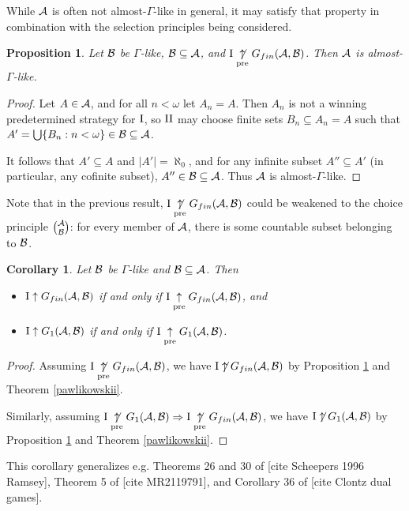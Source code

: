 \documentclass{amsart}
\theoremstyle{plain}
\newtheorem{corollary}[theorem]{Corollary}
\newtheorem{proposition}[theorem]{Proposition}
\theoremstyle{definition}
\theoremstyle{remark}
\theoremstyle{plain}
\theoremstyle{definition}
\theoremstyle{remark}
\begin{document}
While \(\mathcal{A}\) is often not almost-\(\Gamma\)-like in general,
it may satisfy that property in combination with the selection principles
being considered.

\begin{proposition}\label{auto-asl}
Let \(\mathcal{B}\) be \(\Gamma\)-like, \(\mathcal{B}\subseteq\mathcal{A}\),
and \(\mathrm{I}\underset{\text{pre}}{\not\uparrow} G_{fin}(\mathcal{A},\mathcal{B})\). Then
\(\mathcal{A}\) is almost-\(\Gamma\)-like.
\end{proposition}
\begin{proof}
Let \(A\in\mathcal{A}\), and for all \(n<\omega\) let \(A_n=A\).
Then \(A_n\) is not a winning predetermined strategy for
\(\mathrm{I}\), so \(\mathrm{II}\) may choose finite sets
\(B_n\subseteq A_n=A\) such that 
\(A'=\bigcup\{B_n:n<\omega\}\in\mathcal{B}\subseteq\mathcal{A}\).

It follows that \(A'\subseteq A\) and \(|A'|=\aleph_0\), 
and for any infinite subset
\(A''\subseteq A'\) (in particular, any cofinite subset),
\(A''\in\mathcal{B}\subseteq\mathcal{A}\). Thus \(\mathcal{A}\) is almost-\(\Gamma\)-like.
\end{proof}

Note that in the previous result, 
\(\mathrm{I}\underset{\text{pre}}{\not\uparrow} G_{fin}(\mathcal{A},\mathcal{B})\) could be weakened
to the choice principle \({\mathcal{A}}\choose{\mathcal{B}}\): for every
member of \(\mathcal{A}\), there is some countable subset belonging to \(\mathcal{B}\).


\begin{corollary}
Let \(\mathcal{B}\) be \(\Gamma\)-like and \(\mathcal{B}\subseteq\mathcal{A}\).
Then 
\begin{itemize}
\item \(\mathrm{I}\uparrow G_{fin}(\mathcal{A},\mathcal{B})\) if and only if
\(\mathrm{I}\underset{\text{pre}}{\uparrow} G_{fin}(\mathcal{A},\mathcal{B})\), and
\item \(\mathrm{I}\uparrow G_{1}(\mathcal{A},\mathcal{B})\) if and only if
\(\mathrm{I}\underset{\text{pre}}{\uparrow} G_{1}(\mathcal{A},\mathcal{B})\).
\end{itemize}
\end{corollary}
\begin{proof}
Assuming \(\mathrm{I}\underset{\text{pre}}{\not\uparrow} G_{fin}(\mathcal{A},\mathcal{B})\), we have
\(\mathrm{I}\not\uparrow G_{fin}(\mathcal{A},\mathcal{B})\) by Proposition \ref{auto-asl}
and Theorem \ref{pawlikowskii}.

Similarly, assuming \(\mathrm{I}\underset{\text{pre}}{\not\uparrow} G_{1}(\mathcal{A},\mathcal{B})
\Rightarrow\mathrm{I}\underset{\text{pre}}{\not\uparrow} G_{fin}(\mathcal{A},\mathcal{B})\), we have
\(\mathrm{I}\not\uparrow G_{1}(\mathcal{A},\mathcal{B})\) by Proposition \ref{auto-asl}
and Theorem \ref{pawlikowskii}.
\end{proof}

This corollary generalizes e.g. Theorems 26 and 30 of [cite Scheepers 1996 Ramsey],
Theorem 5 of [cite MR2119791], and Corollary 36 of [cite Clontz dual games].
\end{document}
